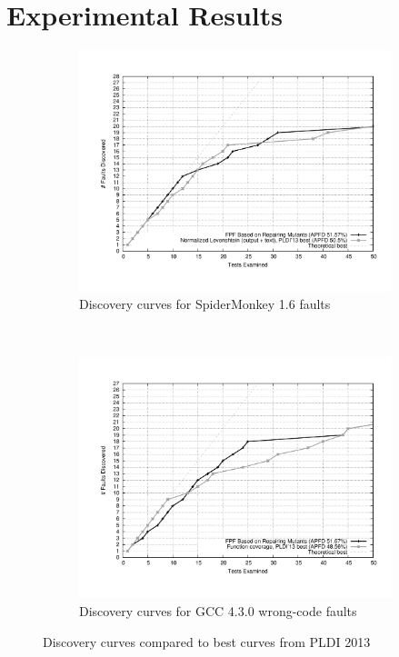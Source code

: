 \section{Experimental Results}

\begin{figure}[t!]
    \centering
    \begin{subfigure}[t]{0.5\textwidth}
        \centering
        \includegraphics[width=1.0\textwidth]{jscurve}
        \caption{Discovery curves for SpiderMonkey 1.6 faults}
        \label{jscurves}
    \end{subfigure}%
    ~ 
    \begin{subfigure}[t]{0.5\textwidth}
        \centering
        \includegraphics[width=1.0\textwidth]{gcccurve}
        \caption{Discovery curves for GCC 4.3.0 wrong-code faults}
        \label{gcccurves}
    \end{subfigure}
    \caption{Discovery curves compared to best curves from PLDI 2013}
\end{figure}


